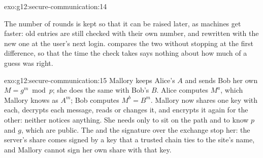 \begin{solution}{exo:g12:secure-communication:14}
\smallskip\noindent\hspace*{2em}

\noindent\hspace*{4em}

\noindent\hspace*{4em}

\noindent\hspace*{4em}

\smallskip\noindent\hspace*{2em}

\noindent\hspace*{4em}

\noindent\hspace*{4em}

\noindent\hspace*{4em}

\smallskip\noindent The number of rounds is kept so that it can be raised later, as machines get faster: old entries
are still checked with their own number, and rewritten with the new one at the user's next login.
 compares the two  without stopping at the first difference, so that the time the
check takes says nothing about how much of a guess was right.
\end{solution}

\begin{solution}{exo:g12:secure-communication:15}
Mallory keeps Alice's $A$ and sends Bob her own $M = g^m \bmod p$; she does the same with Bob's $B$. Alice computes
$M^a$, which Mallory knows as $A^m$; Bob computes $M^b = B^m$. Mallory now shares one key with each, decrypts each
message, reads or changes it, and encrypts it again for the other: neither notices anything. She needs only to sit on
the path and to know $p$ and $g$, which are public. The  and the signature over the exchange stop her: the
server's share comes signed by a key that a trusted chain ties to the site's name, and Mallory cannot sign her own
share with that key.
\end{solution}


